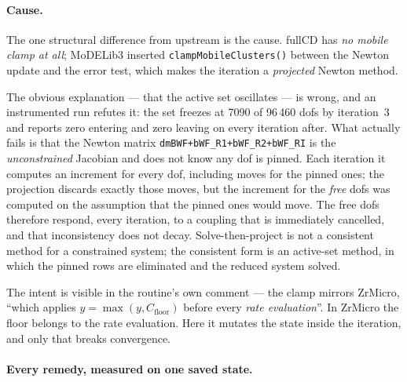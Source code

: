 \documentclass[11pt,a4paper]{article}
\newcommand{\code}[1]{\texttt{\small #1}}
\begin{document}
\paragraph{Cause.} The one structural difference from upstream is the cause.
fullCD has \emph{no mobile clamp at all}; MoDELib3 inserted
\code{clampMobileClusters()} between the Newton update and the error test, which
makes the iteration a \emph{projected} Newton method.

The obvious explanation --- that the active set oscillates --- is wrong, and an
instrumented run refutes it: the set freezes at 7090 of 96\,460 dofs by
iteration~3 and reports zero entering and zero leaving on every iteration after.
What actually fails is that the Newton matrix
\code{dmBWF+bWF\_R1+bWF\_R2+bWF\_RI} is the \emph{unconstrained} Jacobian and
does not know any dof is pinned. Each iteration it computes an increment for
every dof, including moves for the pinned ones; the projection discards exactly
those moves, but the increment for the \emph{free} dofs was computed on the
assumption that the pinned ones would move. The free dofs therefore respond,
every iteration, to a coupling that is immediately cancelled, and that
inconsistency does not decay. Solve-then-project is not a consistent method for
a constrained system; the consistent form is an active-set method, in which the
pinned rows are eliminated and the reduced system solved.

The intent is visible in the routine's own comment --- the clamp mirrors
ZrMicro, ``which applies $y=\max(y,C_{\mathrm{floor}})$ before every \emph{rate
evaluation}''. In ZrMicro the floor belongs to the rate evaluation. Here it
mutates the state inside the iteration, and only that breaks convergence.

\paragraph{Every remedy, measured on one saved state.}
\end{document}
